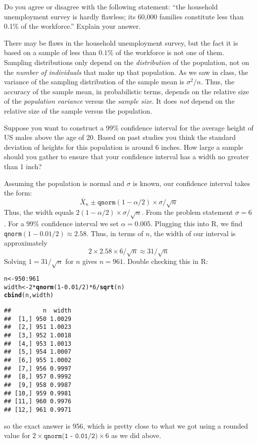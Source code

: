 \documentclass[addpoints,12pt]{exam}\usepackage[]{graphicx}\usepackage[]{color}
\makeatletter
\newcommand{\hlnum}[1]{\textcolor[rgb]{0.686,0.059,0.569}{#1}}%
\newcommand{\hlopt}[1]{\textcolor[rgb]{0,0,0}{#1}}%
\newcommand{\hlstd}[1]{\textcolor[rgb]{0.345,0.345,0.345}{#1}}%
\newcommand{\hlkwb}[1]{\textcolor[rgb]{0.69,0.353,0.396}{#1}}%
\newcommand{\hlkwd}[1]{\textcolor[rgb]{0.737,0.353,0.396}{\textbf{#1}}}%
\newenvironment{kframe}{%
 \def\at@end@of@kframe{}%
 \ifinner\ifhmode%
  \def\at@end@of@kframe{\end{minipage}}%
  \begin{minipage}{\columnwidth}%
 \fi\fi%
 \def\FrameCommand##1{\hskip\@totalleftmargin \hskip-\fboxsep
 \colorbox{shadecolor}{##1}\hskip-\fboxsep
     \hskip-\linewidth \hskip-\@totalleftmargin \hskip\columnwidth}%
 \MakeFramed {\advance\hsize-\width
   \@totalleftmargin\z@ \linewidth\hsize
   \@setminipage}}%
 {\par\unskip\endMakeFramed%
 \at@end@of@kframe}
\newenvironment{knitrout}{}{} %
\makeatother
\begin{document}
\begin{questions}
\question Do you agree or disagree with the following statement: ``the household unemployment survey is hardly flawless; its 60,000 families constitute less than 0.1\% of the workforce.'' Explain your answer.
	\begin{solution}
	There may be flaws in the household unemployment survey, but the fact it is based on a sample of less than $0.1$\% of the workforce is not one of them. Sampling distributions only depend on the \emph{distribution} of the population, not on the \emph{number of individuals} that make up that population. As we saw in class, the variance of the sampling distribution of the sample mean is $\sigma^2/n$. Thus, the accuracy of the sample mean, in probabilistic terms, depends on the relative size of the \emph{population variance} versus the \emph{sample size}. It does \emph{not} depend on the relative size of the sample versus the population. 
	\end{solution}

\question Suppose you want to construct a 99\% confidence interval for the average height of US males above the age of 20. Based on past studies you think the standard deviation of heights for this population is around 6 inches. How large a sample should you gather to ensure that your confidence interval has a width no greater than 1 inch?
	\begin{solution}
		Assuming the population is normal and $\sigma$ is known, our confidence interval takes the form:
			$$\bar{X}_n \pm \texttt{qnorm}(1 - \alpha/2) \times \sigma/\sqrt{n}$$
		Thus, the width equals $2(1 - \alpha/2) \times \sigma/\sqrt{n}$. From the problem statement $\sigma = 6$. For a 99\% confidence interval we set $\alpha = 0.005$. Plugging this into R, we find \texttt{qnorm}$(1 - 0.01/2) \approx 2.58$. Thus, in terms of $n$, the width of our interval is approximately 
		$$ 2 \times 2.58 \times 6/\sqrt{n} \approx 31/\sqrt{n}$$
		Solving $1 = 31/\sqrt{n}$ for $n$ gives $n = 961$. Double checking this in R:
\begin{knitrout}
\color{fgcolor}\begin{kframe}
\begin{alltt}
\hlstd{n} \hlkwb{<-} \hlnum{950}\hlopt{:}\hlnum{961}
\hlstd{width} \hlkwb{<-} \hlnum{2} \hlopt{*} \hlkwd{qnorm}\hlstd{(}\hlnum{1} \hlopt{-} \hlnum{0.01}\hlopt{/}\hlnum{2}\hlstd{)} \hlopt{*} \hlnum{6}\hlopt{/}\hlkwd{sqrt}\hlstd{(n)}
\hlkwd{cbind}\hlstd{(n, width)}
\end{alltt}
\begin{verbatim}
##         n  width
##  [1,] 950 1.0029
##  [2,] 951 1.0023
##  [3,] 952 1.0018
##  [4,] 953 1.0013
##  [5,] 954 1.0007
##  [6,] 955 1.0002
##  [7,] 956 0.9997
##  [8,] 957 0.9992
##  [9,] 958 0.9987
## [10,] 959 0.9981
## [11,] 960 0.9976
## [12,] 961 0.9971
\end{verbatim}
\end{kframe}
\end{knitrout}
so the exact answer is 956, which is pretty close to what we got using a rounded value for $2 \times \texttt{qnorm(1 - 0.01/2)} \times 6$ as we did above.
	\end{solution}


\end{questions}
\end{document}

